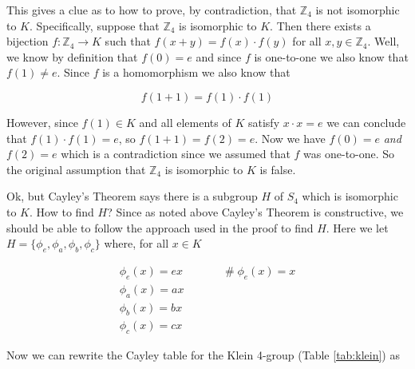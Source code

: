 \documentclass{article}
\theoremstyle{definition}
\begin{document}
\bigskip
\noindent
This gives a clue as to how to prove, by contradiction, that
$\mathbb{Z}_4$ is not isomorphic to $K$. Specifically, suppose
that $\mathbb{Z}_4$ is isomorphic to $K$. Then there exists a
bijection $f: \mathbb{Z}_4 \rightarrow K$ such that $f(x + y) =
f(x) \cdot f(y)$ for all $x,y \in \mathbb{Z}_4$. Well, we know by
definition that $f(0) = e$ and since $f$ is one-to-one we also
know that $f(1) \neq e$. Since $f$ is a homomorphism we also know
that

\begin{equation*}
f(1+1) = f(1) \cdot f(1)
\end{equation*}


\bigskip
\noindent
However, since $f(1) \in K$ and all elements of $K$ satisfy $x
\cdot x = e$ we can conclude that $f(1) \cdot f(1) = e$, so
$f(1+1) = f(2) = e$. Now we have $f(0) = e$ \emph{and} $f(2) = e$
which is a contradiction since we assumed that $f$ was
one-to-one. So the original assumption that $\mathbb{Z}_4$ is
isomorphic to $K$ is false.

\bigskip
\noindent
Ok, but Cayley's Theorem says there is a subgroup $H$ of $S_4$
which is isomorphic to $K$. How to find $H$? Since as noted above
Cayley's Theorem is constructive, we should be able to follow the
approach used in the proof to find $H$. Here we let $H
=\{\phi_{e}, \phi_{a}, \phi_{b}, \phi_{c}\}$ where, for all $x
\in K$

\bigskip
\begin{equation*}
\begin{array}{llll}
\phi_{e}(x) = ex   &&& \quad \mathrel{\#}  \phi_{e}(x) = x  \\
\phi_{a}(x) = ax                                            \\    
\phi_{b}(x) = bx                                            \\       
\phi_{c}(x) = cx
\end{array}
\end{equation*}

\bigskip
\noindent
Now we can rewrite the Cayley table for the Klein 4-group (Table
\ref{tab:klein}) as
\end{document}
